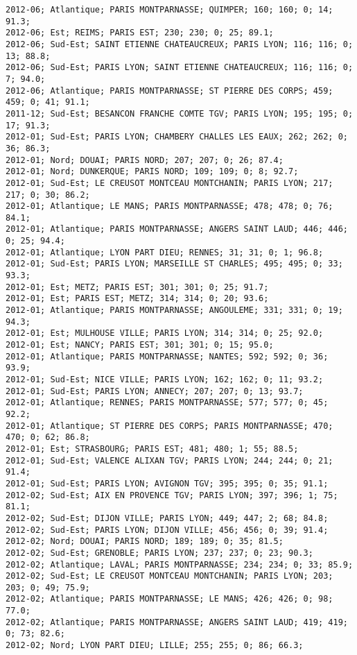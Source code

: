 \documentclass{article}
\begin{document}
\begin{Verbatim}[commandchars=\\\{\}]
2012-06; Atlantique; PARIS MONTPARNASSE; QUIMPER; 160; 160; 0; 14; 91.3; 
2012-06; Est; REIMS; PARIS EST; 230; 230; 0; 25; 89.1; 
2012-06; Sud-Est; SAINT ETIENNE CHATEAUCREUX; PARIS LYON; 116; 116; 0; 13; 88.8; 
2012-06; Sud-Est; PARIS LYON; SAINT ETIENNE CHATEAUCREUX; 116; 116; 0; 7; 94.0; 
2012-06; Atlantique; PARIS MONTPARNASSE; ST PIERRE DES CORPS; 459; 459; 0; 41; 91.1; 
2011-12; Sud-Est; BESANCON FRANCHE COMTE TGV; PARIS LYON; 195; 195; 0; 17; 91.3; 
2012-01; Sud-Est; PARIS LYON; CHAMBERY CHALLES LES EAUX; 262; 262; 0; 36; 86.3; 
2012-01; Nord; DOUAI; PARIS NORD; 207; 207; 0; 26; 87.4; 
2012-01; Nord; DUNKERQUE; PARIS NORD; 109; 109; 0; 8; 92.7; 
2012-01; Sud-Est; LE CREUSOT MONTCEAU MONTCHANIN; PARIS LYON; 217; 217; 0; 30; 86.2; 
2012-01; Atlantique; LE MANS; PARIS MONTPARNASSE; 478; 478; 0; 76; 84.1; 
2012-01; Atlantique; PARIS MONTPARNASSE; ANGERS SAINT LAUD; 446; 446; 0; 25; 94.4; 
2012-01; Atlantique; LYON PART DIEU; RENNES; 31; 31; 0; 1; 96.8; 
2012-01; Sud-Est; PARIS LYON; MARSEILLE ST CHARLES; 495; 495; 0; 33; 93.3; 
2012-01; Est; METZ; PARIS EST; 301; 301; 0; 25; 91.7; 
2012-01; Est; PARIS EST; METZ; 314; 314; 0; 20; 93.6; 
2012-01; Atlantique; PARIS MONTPARNASSE; ANGOULEME; 331; 331; 0; 19; 94.3; 
2012-01; Est; MULHOUSE VILLE; PARIS LYON; 314; 314; 0; 25; 92.0; 
2012-01; Est; NANCY; PARIS EST; 301; 301; 0; 15; 95.0; 
2012-01; Atlantique; PARIS MONTPARNASSE; NANTES; 592; 592; 0; 36; 93.9; 
2012-01; Sud-Est; NICE VILLE; PARIS LYON; 162; 162; 0; 11; 93.2; 
2012-01; Sud-Est; PARIS LYON; ANNECY; 207; 207; 0; 13; 93.7; 
2012-01; Atlantique; RENNES; PARIS MONTPARNASSE; 577; 577; 0; 45; 92.2; 
2012-01; Atlantique; ST PIERRE DES CORPS; PARIS MONTPARNASSE; 470; 470; 0; 62; 86.8; 
2012-01; Est; STRASBOURG; PARIS EST; 481; 480; 1; 55; 88.5; 
2012-01; Sud-Est; VALENCE ALIXAN TGV; PARIS LYON; 244; 244; 0; 21; 91.4; 
2012-01; Sud-Est; PARIS LYON; AVIGNON TGV; 395; 395; 0; 35; 91.1; 
2012-02; Sud-Est; AIX EN PROVENCE TGV; PARIS LYON; 397; 396; 1; 75; 81.1; 
2012-02; Sud-Est; DIJON VILLE; PARIS LYON; 449; 447; 2; 68; 84.8; 
2012-02; Sud-Est; PARIS LYON; DIJON VILLE; 456; 456; 0; 39; 91.4; 
2012-02; Nord; DOUAI; PARIS NORD; 189; 189; 0; 35; 81.5; 
2012-02; Sud-Est; GRENOBLE; PARIS LYON; 237; 237; 0; 23; 90.3; 
2012-02; Atlantique; LAVAL; PARIS MONTPARNASSE; 234; 234; 0; 33; 85.9; 
2012-02; Sud-Est; LE CREUSOT MONTCEAU MONTCHANIN; PARIS LYON; 203; 203; 0; 49; 75.9; 
2012-02; Atlantique; PARIS MONTPARNASSE; LE MANS; 426; 426; 0; 98; 77.0; 
2012-02; Atlantique; PARIS MONTPARNASSE; ANGERS SAINT LAUD; 419; 419; 0; 73; 82.6; 
2012-02; Nord; LYON PART DIEU; LILLE; 255; 255; 0; 86; 66.3; 

\end{Verbatim}
\end{document}
